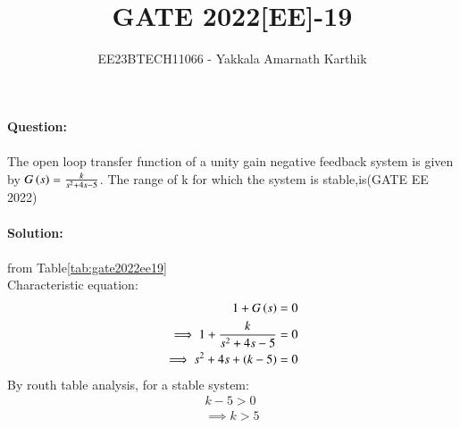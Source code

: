 \documentclass[journal,12pt,twocolumn]{IEEEtran}
\begin{document}


\title{GATE 2022[EE]-19}
\author{EE23BTECH11066 - Yakkala Amarnath Karthik}
\maketitle


\textbf{Question:}\\ \\
The open loop transfer function of a unity gain negative feedback system is given by $G\left(s\right)= \frac{k}{s^2 +4s-5}$. The range of k for which the system is stable,is\hfill(GATE EE 2022)\\ \\

\textbf{Solution:}\\ 
\\
 from Table\ref{tab:gate2022ee19}\\
Characteristic equation:
\begin{align}
    1+G\left(s\right)=0\\
    \implies 1+\frac{k}{s^2 +4s-5}=0\\
    \implies s^2+4s+\left(k-5\right)=0
\end{align}
By routh table analysis, for a stable system:
\begin{align}
    k-5>0\\
    \implies k>5
\end{align}
\end{document}
